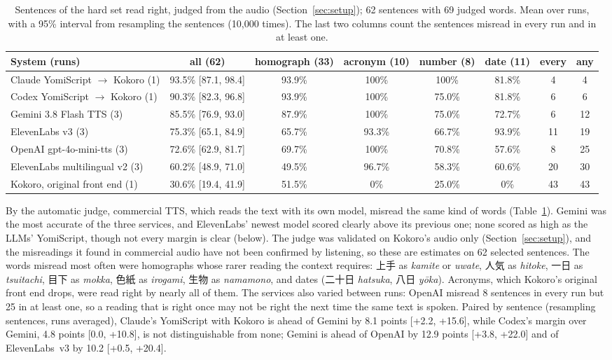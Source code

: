 \documentclass[11pt,a4paper]{article}
\begin{document}
\begin{table}[t]
\centering\small
\caption{Sentences of the hard set read right, judged from the audio (Section~\ref{sec:setup}); 62 sentences with 69
judged words. Mean over runs, with a 95\% interval from resampling the sentences (10{,}000 times).
The last two columns count the sentences misread in every run and in at least one.}
\label{tab:commercial}
\setlength{\tabcolsep}{4pt}
\begin{tabular}{lccccccc}
\toprule
System (runs) & all (62) & homograph (33) & acronym (10) & number (8) & date (11) & every & any\\
\midrule
Claude YomiScript $\to$ Kokoro (1) & 93.5\% [87.1, 98.4] & 93.9\% & 100\% & 100\% & 81.8\% & 4 & 4\\
Codex YomiScript $\to$ Kokoro (1) & 90.3\% [82.3, 96.8] & 93.9\% & 100\% & 75.0\% & 81.8\% & 6 & 6\\
Gemini 3.8 Flash TTS (3) & 85.5\% [76.9, 93.0] & 87.9\% & 100\% & 75.0\% & 72.7\% & 6 & 12\\
ElevenLabs v3 (3) & 75.3\% [65.1, 84.9] & 65.7\% & 93.3\% & 66.7\% & 93.9\% & 11 & 19\\
OpenAI gpt-4o-mini-tts (3) & 72.6\% [62.9, 81.7] & 69.7\% & 100\% & 70.8\% & 57.6\% & 8 & 25\\
ElevenLabs multilingual v2 (3) & 60.2\% [48.9, 71.0] & 49.5\% & 96.7\% & 58.3\% & 60.6\% & 20 & 30\\
Kokoro, original front end (1) & 30.6\% [19.4, 41.9] & 51.5\% & 0\% & 25.0\% & 0\% & 43 & 43\\
\bottomrule
\end{tabular}
\end{table}

By the automatic judge, commercial TTS, which reads the text with its own model, misread the same kind of words
(Table~\ref{tab:commercial}). Gemini was the most accurate of the three services, and ElevenLabs' newest model scored
clearly above its previous one; none scored as high as the LLMs' YomiScript, though not every margin is clear (below). The judge was validated on Kokoro's audio only
(Section~\ref{sec:setup}), and the misreadings it found in commercial audio have not been confirmed by listening, so
these are estimates on 62 selected sentences. The words misread most often
were homographs whose rarer reading the context requires: 上手 as \emph{kamite} or \emph{uwate}, 人気 as \emph{hitoke},
一日 as \emph{tsuitachi}, 目下 as \emph{mokka}, 色紙 as \emph{irogami}, 生物 as \emph{namamono},
and dates (二十日 \emph{hatsuka}, 八日 \emph{yōka}). Acronyms, which Kokoro's original front end drops, were read right
by nearly all of them. The services also varied between runs: OpenAI misread 8 sentences in every run but 25 in at
least one, so a reading that is right once may not be right the next time the same text is spoken. Paired by
sentence (resampling sentences, runs averaged), Claude's YomiScript with Kokoro is ahead of Gemini by 8.1 points
[+2.2, +15.6], while Codex's margin over Gemini, 4.8 points [0.0, +10.8], is not distinguishable from none; Gemini is
ahead of OpenAI by 12.9 points [+3.8, +22.0] and of ElevenLabs~v3 by 10.2 [+0.5, +20.4].
\end{document}
